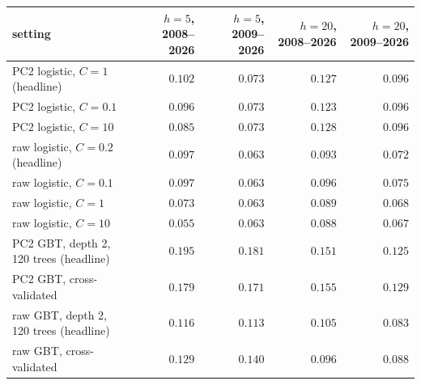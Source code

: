 \begin{tabular}{lrrrr}\toprule
setting & $h=5$, 2008--2026 & $h=5$, 2009--2026 & $h=20$, 2008--2026 & $h=20$, 2009--2026\\\midrule
PC2 logistic, $C=1$ (headline) & $0.102$ & $0.073$ & $0.127$ & $0.096$\\
PC2 logistic, $C=0.1$ & $0.096$ & $0.073$ & $0.123$ & $0.096$\\
PC2 logistic, $C=10$ & $0.085$ & $0.073$ & $0.128$ & $0.096$\\
raw logistic, $C=0.2$ (headline) & $0.097$ & $0.063$ & $0.093$ & $0.072$\\
raw logistic, $C=0.1$ & $0.097$ & $0.063$ & $0.096$ & $0.075$\\
raw logistic, $C=1$ & $0.073$ & $0.063$ & $0.089$ & $0.068$\\
raw logistic, $C=10$ & $0.055$ & $0.063$ & $0.088$ & $0.067$\\
PC2 GBT, depth 2, 120 trees (headline) & $0.195$ & $0.181$ & $0.151$ & $0.125$\\
PC2 GBT, cross-validated & $0.179$ & $0.171$ & $0.155$ & $0.129$\\
raw GBT, depth 2, 120 trees (headline) & $0.116$ & $0.113$ & $0.105$ & $0.083$\\
raw GBT, cross-validated & $0.129$ & $0.140$ & $0.096$ & $0.088$\\
\bottomrule\end{tabular}
